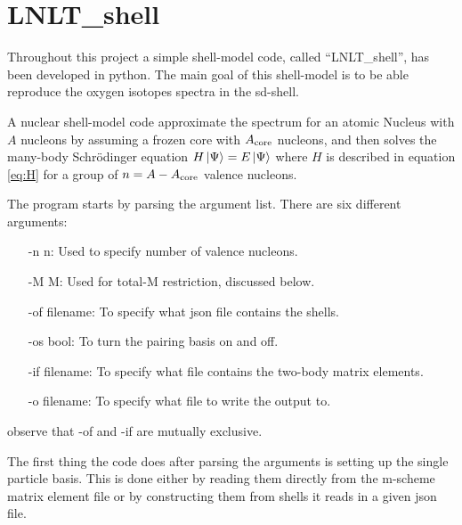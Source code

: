 \section{LNLT\_shell} \label{sec:CodeExpl}


Throughout this project a simple shell-model code, called ``LNLT\_shell'', has been developed in python. The main goal of this shell-model is to be able reproduce the oxygen isotopes spectra in the sd-shell.


A nuclear shell-model code approximate the spectrum for an atomic Nucleus with \(A\) nucleons by assuming a frozen core with \(A_{\rm{core}}\) nucleons, and then solves the many-body Schrödinger equation \(H\ket{\Psi}=E\ket{\Psi}\) where \(H\) is described in equation \ref{eq:H}
for a group of \(n=A-A_{\rm{core}}\) valence nucleons.



The program starts by parsing the argument list. There are six different arguments:
\begin{itemize}
\item[-n n:] Used to specify number of valence nucleons.
\item[-M M:] Used for total-M restriction, discussed below.
\item[-of filename:] To specify what json file contains the shells.
\item[-os bool:] To turn the pairing basis on and off.
\item[-if filename:] To specify what file contains the two-body matrix elements.
\item[-o filename:] To specify what file to write the output to.
\end{itemize}
observe that -of and -if are mutually exclusive.




The first thing the code does after parsing the arguments is setting up the single particle basis.
This is done either by reading them directly from the m-scheme matrix element file %
or by constructing them from shells it reads in a given json file.



